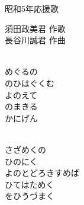 \documentclass[10pt,b5j]{tarticle} %
\begin{document}
\begin{minipage}[c]{0.7\hsize} %
    \begin{center}
        {\LARGE
            昭和5年応援歌 %
        }
        {\small 
        }
    \end{center}
\end{minipage}
\begin{minipage}[c]{0.3\hsize} %
    \begin{flushright} %
        須田政美君 作歌\\長谷川誠君 作曲 %
    \end{flushright}
\end{minipage}

\vspace{1.5em} %
\newcommand{\linespace}{0.5em} %
\newcommand{\blocksize}{0.5\hsize} %
\newcommand{\itemmargin}{6em} %
\begin{enumerate} %
    \setlength{\itemindent}{\itemmargin} %
    \begin{minipage}[c]{\blocksize}
    
        \vspace{\linespace}
        \item~\\
        めぐるの\\
        のひはぐくむ\\
        よのえて\\
        のまきる\\
        かにげん
        
        \vspace{\linespace}
        \item~\\
        さざめくの\\
        ひのにく\\
        よのとどろきすめば\\
        ひてはためく\\
        をひうづまく
    
    \end{minipage}
\end{enumerate} %
\end{document}
